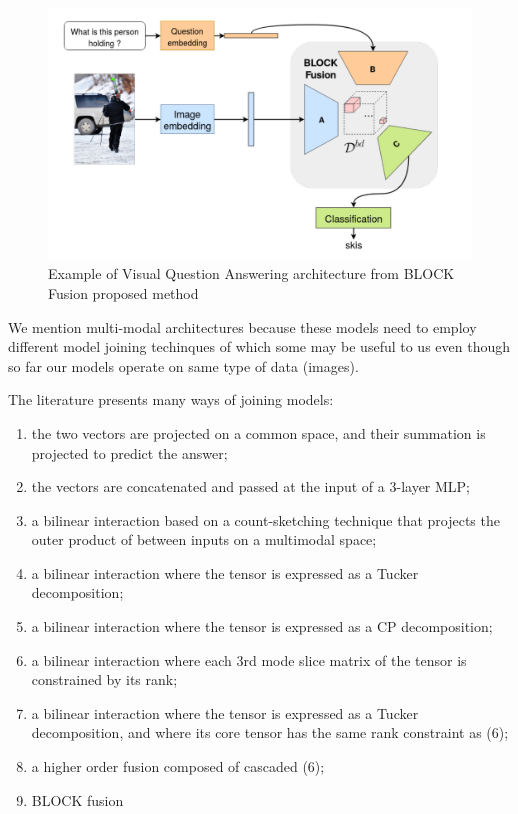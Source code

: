 \documentclass[b5paper]{book}
\let\cite\parencite
\begin{document}
\begin{figure}
    \centering
    \includegraphics[scale=0.25]{figures/block.png}
    \caption{Example of Visual Question Answering architecture from BLOCK Fusion proposed method \cite{ben2019block}}
    \label{fig:block}
\end{figure}

We mention multi-modal architectures because these models need to employ different model joining techinques of which some may be useful to us even though so far our models operate on same type of data (images). 

The literature presents many ways of joining models:

\begin{enumerate}
    \item the two vectors are projected on a common space, and their summation is projected to predict the answer;
    \item the vectors are concatenated and passed at the input
of a 3-layer MLP;
    \item a bilinear interaction based on a count-sketching
technique that projects the outer product of between inputs
on a multimodal space;
    \item a bilinear interaction where the tensor is expressed
as a Tucker decomposition;
    \item a bilinear interaction where the tensor is expressed
as a CP decomposition;
    \item a bilinear interaction where each 3rd mode slice matrix of the tensor is constrained by its rank;
    \item a bilinear interaction where the tensor is expressed
as a Tucker decomposition, and where its core tensor has the
same rank constraint as (6);
    \item a higher order fusion composed of cascaded (6);
    \item BLOCK fusion \cite{ben2019block}
\end{enumerate}
\end{document}
